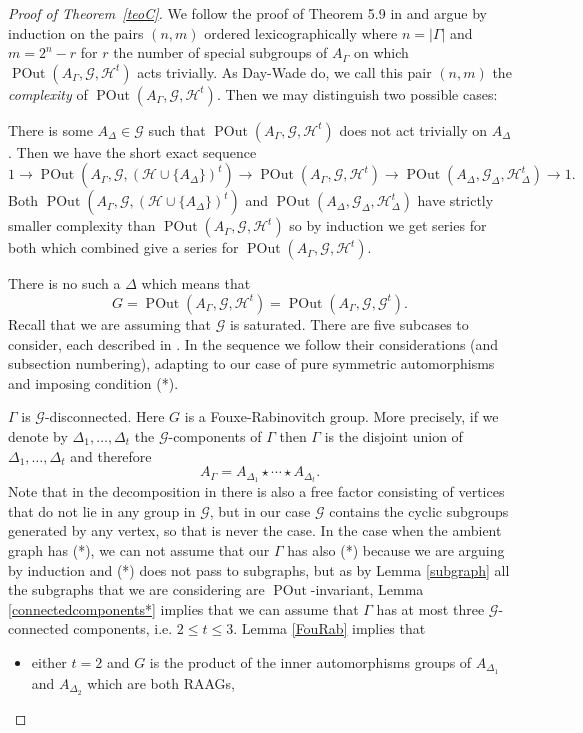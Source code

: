 \documentclass[10pt]{amsart}
\theoremstyle{definition}
\newcommand{\POut}{\operatorname {POut}}
\theoremstyle{definition}
\numberwithin{equation}{section}
\begin{document}
  \begin{proof}[Proof of Theorem~\ref{teoC}]
 We follow the proof of Theorem 5.9 in \cite{DayWade} and argue by induction on the pairs $(n,m)$ ordered lexicographically where $n=|\Gamma|$ and $m=2^n-r$ for $r$ the number of special subgroups of $A_\Gamma$ on which $\POut(A_\Gamma,\mathcal{G},\mathcal{H}^t)$ acts trivially. As Day-Wade do, we call this pair $(n,m)$ the {\sl complexity} of $\POut(A_\Gamma,\mathcal{G},\mathcal{H}^t)$.
 Then we may distinguish two possible cases:
 
 \medskip

  There is some $A_\Delta\in\mathcal{G}$ such that $\POut(A_\Gamma,\mathcal{G},\mathcal{H}^t)$ does not act trivially on $A_\Delta$. Then we have the short exact sequence
 \[1\to\POut(A_\Gamma,\mathcal{G},(\mathcal{H}\cup\{A_\Delta\})^t)\to\POut(A_\Gamma,\mathcal{G},\mathcal{H}^t)\to\POut(A_\Delta,\mathcal{G}_\Delta,\mathcal{H}_\Delta^t)\to 1.\]
  Both $\POut(A_\Gamma,\mathcal{G},(\mathcal{H}\cup\{A_\Delta\})^t)$ and $\POut(A_\Delta,\mathcal{G}_\Delta,\mathcal{H}_\Delta^t)$ have strictly smaller complexity than $\POut(A_\Gamma,\mathcal{G},\mathcal{H}^t)$ so by induction we get series for both which combined give a series for $\POut(A_\Gamma,\mathcal{G},\mathcal{H}^t)$.
 
 \medskip
  There is no such a $\Delta$ which means that
 \[G=\POut(A_\Gamma,\mathcal{G},\mathcal{H}^t)=\POut(A_\Gamma,\mathcal{G},\mathcal{G}^t).\]
 Recall that we are assuming that $\mathcal{G}$ is saturated. There are five subcases to consider, each described in \cite[Section 5]{DayWade}. In the sequence we follow their considerations (and subsection numbering), adapting to our case of pure symmetric automorphisms and imposing condition (*).

\medskip
  $\Gamma$ is $\mathcal{G}$-disconnected. Here $G$ is a Fouxe-Rabinovitch group. More precisely,
if we denote by $\Delta_1,\ldots,\Delta_t$ the $\mathcal{G}$-components of $\Gamma$ then $\Gamma$ is the disjoint union of $\Delta_1,\ldots,\Delta_t$ and therefore
\[A_\Gamma=A_{\Delta_1}\star\cdots\star A_{\Delta_t}.\]
Note that in the decomposition in \cite[Subsection~5.1.1]{DayWade} there is also a free factor consisting of vertices that do not lie in any group in $\mathcal{G}$, but in our case $\mathcal{G}$ contains the cyclic subgroups generated by any vertex, so that is never the case. In the case when the ambient graph has (*), we can not assume that our $\Gamma$ has also (*) because we are arguing by induction and (*) does not pass to subgraphs, but as by Lemma \ref{subgraph} all the subgraphs that we are considering are $\POut$-invariant, Lemma \ref{connectedcomponents*} implies that we can assume that $\Gamma$ has at most three $\mathcal{G}$-connected components, i.e. $2 \leq t\leq 3$. Lemma \ref{FouRab} implies that
\begin{itemize}
\item either $t=2$ and $G$ is the product of the inner automorphisms groups of $A_{\Delta_1}$ and $A_{\Delta_2}$ which are both RAAGs,


\end{itemize}
\end{proof}
\end{document}
